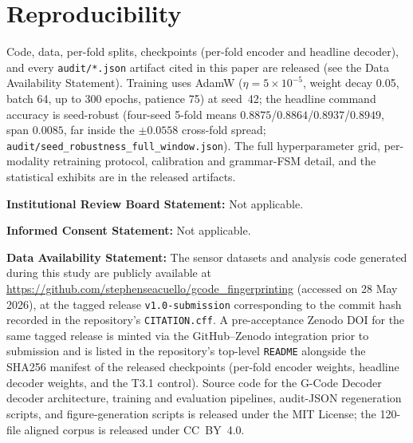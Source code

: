 \documentclass[sensors,article,submit,moreauthors,pdftex]{Definitions/mdpi}
\newcommand{\modelname}{G-Code Decoder}
\providecommand{\institutionalreview}[1]{\medskip\noindent\textbf{Institutional Review Board Statement:} #1\par}
\providecommand{\informedconsent}[1]{\medskip\noindent\textbf{Informed Consent Statement:} #1\par}
\providecommand{\dataavailability}[1]{\medskip\noindent\textbf{Data Availability Statement:} #1\par}
\begin{document}

\section{Reproducibility}
\label{app3:repro}

Code, data, per-fold splits, checkpoints (per-fold encoder and headline decoder), and every \texttt{audit/*.json} artifact cited in this paper are released (see the Data Availability Statement). Training uses AdamW ($\eta=5\times10^{-5}$, weight decay 0.05, batch 64, up to 300 epochs, patience 75) at seed~42; the headline command accuracy is seed-robust (four-seed 5-fold means $0.8875$/$0.8864$/$0.8937$/$0.8949$, span $0.0085$, far inside the $\pm 0.0558$ cross-fold spread; \texttt{audit/seed\_robustness\_full\_window.json}). The full hyperparameter grid, per-modality retraining protocol, calibration and grammar-FSM detail, and the statistical exhibits are in the released artifacts.



\institutionalreview{Not applicable.}

\informedconsent{Not applicable.}

\dataavailability{The sensor datasets and analysis code generated during this study are publicly available at \url{https://github.com/stephenseacuello/gcode_fingerprinting} (accessed on 28 May 2026), at the tagged release \texttt{v1.0-submission} corresponding to the commit hash recorded in the repository's \texttt{CITATION.cff}. A pre-acceptance Zenodo DOI for the same tagged release is minted via the GitHub--Zenodo integration prior to submission and is listed in the repository's top-level \texttt{README} alongside the SHA256 manifest of the released checkpoints (per-fold encoder weights, headline decoder weights, and the T3.1 control). Source code for the \modelname{} decoder architecture, training and evaluation pipelines, audit-JSON regeneration scripts, and figure-generation scripts is released under the MIT License; the 120-file aligned corpus is released under CC~BY~4.0.}
\end{document}
